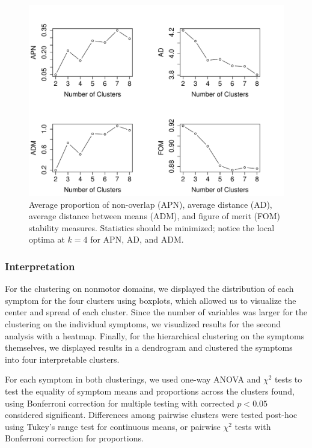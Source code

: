 \documentclass[preprint,3p,twocolumn]{elsarticle} %
\begin{document}
\begin{figure}[h]
  \centering
  \includegraphics[width=\linewidth]{stability-measures.pdf}
  \caption{Average proportion of non-overlap (APN), average distance (AD), average distance
    between means (ADM), and figure of merit (FOM) stability measures\cite{datta2006methods,
    yeung2001validating}. Statistics should be minimized; notice the local optima at $k = 4$ for
  APN, AD, and ADM.}
  \label{fig:stability}
\end{figure}

\subsubsection{Interpretation}

For the clustering on nonmotor domains, we displayed the distribution of each symptom for the four
clusters using boxplots, which allowed us to visualize the center and spread of each cluster. Since
the number of variables was larger for the clustering on the individual symptoms, we visualized
results for the second analysis with a heatmap. Finally, for the hierarchical clustering on the
symptoms themselves, we displayed results in a dendrogram and clustered the symptoms into four
interpretable clusters.

For each symptom in both clusterings, we used one-way ANOVA and $\chi^2$ tests to test the equality
of symptom means and proportions across the clusters found, using Bonferroni correction for
multiple testing with corrected $p < 0.05$ considered significant. Differences among pairwise
clusters were tested post-hoc using Tukey's range test for continuous means, or pairwise $\chi^2$
tests with Bonferroni correction for proportions.
\end{document}

